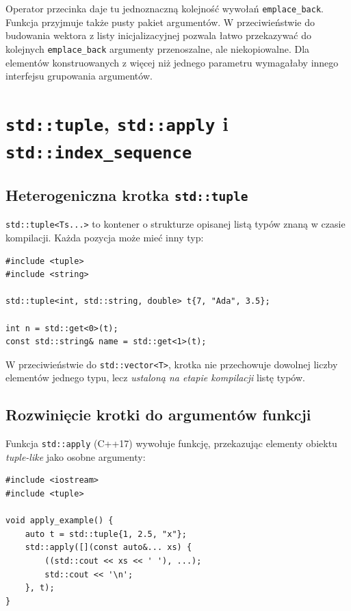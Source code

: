 Operator przecinka daje tu jednoznaczną kolejność wywołań
\texttt{emplace\_back}. Funkcja przyjmuje także pusty pakiet
argumentów. W przeciwieństwie do budowania wektora z listy
inicjalizacyjnej pozwala łatwo przekazywać do kolejnych
\texttt{emplace\_back} argumenty przenoszalne, ale niekopiowalne.
Dla elementów konstruowanych z więcej niż jednego parametru
wymagałaby innego interfejsu grupowania argumentów.

\section{\texttt{std::tuple}, \texttt{std::apply} i \texttt{std::index\_sequence}}
\label{sec:variadic-tuple}

\subsection{Heterogeniczna krotka \texttt{std::tuple}}

\texttt{std::tuple<Ts...>} to kontener o strukturze opisanej
listą typów znaną w czasie kompilacji. Każda pozycja może
mieć inny typ:

\begin{lstlisting}
#include <tuple>
#include <string>

std::tuple<int, std::string, double> t{7, "Ada", 3.5};

int n = std::get<0>(t);
const std::string& name = std::get<1>(t);
\end{lstlisting}

W przeciwieństwie do \texttt{std::vector<T>}, krotka nie
przechowuje dowolnej liczby elementów jednego typu, lecz
\emph{ustaloną na etapie kompilacji} listę typów.

\subsection{Rozwinięcie krotki do argumentów funkcji}

Funkcja \texttt{std::apply} (C++17) wywołuje funkcję,
przekazując elementy obiektu \emph{tuple-like} jako osobne
argumenty:

\begin{lstlisting}
#include <iostream>
#include <tuple>

void apply_example() {
    auto t = std::tuple{1, 2.5, "x"};
    std::apply([](const auto&... xs) {
        ((std::cout << xs << ' '), ...);
        std::cout << '\n';
    }, t);
}
\end{lstlisting}


